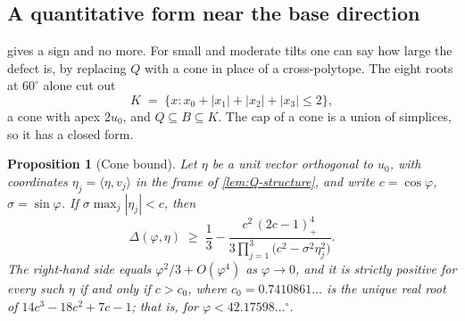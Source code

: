 \documentclass[11pt,reqno]{amsart}
\renewcommand{\_}{\origunderscore\allowbreak}
\numberwithin{equation}{section}
\theoremstyle{plain}
\newtheorem{prop}[thm]{Proposition}
\theoremstyle{definition}
\theoremstyle{remark}
\newcommand{\tilt}{\varphi}                  %
\newcommand{\dev}{\eta}                      %
\newcommand{\defect}{\Delta}                 %
\newcommand{\base}{u}                        %
\begin{document}
\subsection{A quantitative form near the base direction}\label{sec:quantitative-cone}

 gives a sign and no more. For small and moderate
tilts one can say how large the defect is, by replacing $Q$ with a cone in place of a cross-polytope. The eight roots at $60^\circ$ alone
cut out
\[
  K \;=\; \bigl\{x : x_0+|x_1|+|x_2|+|x_3|\le2\bigr\},
\]
a cone with apex $2\base_0$, and $Q\subseteq B\subseteq K$. The cap of a
cone is a union of simplices, so it has a closed form.

\begin{prop}[Cone bound]\label{cor:second-order}
Let $\dev$ be a unit vector orthogonal to $\base_0$, with coordinates
$\dev_j=\langle\dev,v_j\rangle$ in the frame of \cref{lem:Q-structure},
and write $c=\cos\tilt$, $\sigma=\sin\tilt$. If
$\sigma\max_j|\dev_j|<c$, then
\begin{equation}\label{eq:cone-bound}
  \defect(\tilt,\dev)\;\ge\;
  \frac13-\frac{c^2\,(2c-1)_+^4}{3\prod_{j=1}^{3}\bigl(c^2-\sigma^2\dev_j^2\bigr)} .
\end{equation}
The right-hand side equals $\tilt^2/3+O(\tilt^4)$ as $\tilt\to0$, and it
is strictly positive for every such $\dev$ if and only if $c>c_0$, where
$c_0=0.7410861\ldots$ is the unique real root of
$14c^3-18c^2+7c-1$; that is, for $\tilt<42.17598\ldots^\circ$.
\end{prop}
\end{document}
